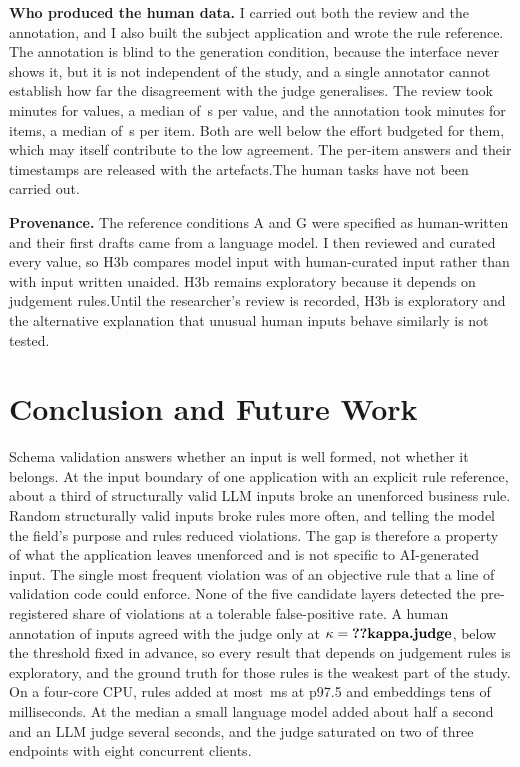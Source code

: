 \documentclass[conference]{IEEEtran}
\begin{document}
\textbf{Who produced the human data.} \ifhumanlabels I carried out both the review and the annotation,
and I also built the subject application and wrote the rule reference. The annotation
is blind to the generation condition, because the interface never shows it, but it is not independent
of the study, and a single annotator cannot establish how far the disagreement with the judge
generalises. The review took  minutes for  values, a median of
\,s per value, and the annotation took  minutes for 
items, a median of \,s per item. Both are well below the effort budgeted for them,
which may itself contribute to the low agreement. The per-item answers and their timestamps are
released with the artefacts.\else The human tasks have not been carried out.\fi

\textbf{Provenance.} The reference conditions A and G were specified as human-written and their
first drafts came from a language model. \ifreviewed I then reviewed and curated every value, so H3b
compares model input with human-curated input rather than with input written unaided. H3b remains
exploratory because it depends on judgement rules.\else Until the researcher's review is recorded, H3b is
exploratory and the alternative explanation that unusual human inputs behave similarly is not
tested.\fi

\section{Conclusion and Future Work}
\label{sec:conclusion}

Schema validation answers whether an input is well formed, not whether it belongs. At the input
boundary of one application with an explicit rule reference, about a third of structurally valid LLM
inputs broke an unenforced business rule. Random structurally valid inputs broke rules more often, and
telling the model the field's purpose and rules reduced violations. The gap is therefore a property of
what the application leaves unenforced and is not specific to AI-generated input. The single most
frequent violation was of an objective rule that a line of validation code could enforce. None of the
five candidate layers detected the pre-registered share of violations at a tolerable false-positive
rate.\ifjudgeweak{} A human annotation of  inputs agreed with the judge only at
$\kappa=\R{kappa.judge}$, below the threshold fixed in advance, so every result that depends on
judgement rules is exploratory, and the ground truth for those rules is the weakest part of the
study.\fi{} On a four-core CPU, rules added at most \,ms at p97.5 and embeddings tens
of milliseconds. At the median a small language model added about half a second and an LLM judge
several seconds, and the judge saturated on two of three endpoints with eight concurrent clients.
\end{document}
